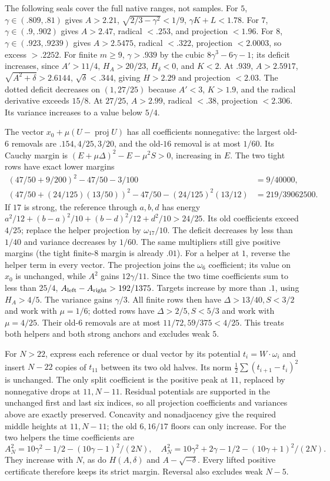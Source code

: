 The following seals cover the full native ranges, not samples.
For $5$, $\gamma\in(.809,.81)$ gives $A>2.21$,
$\sqrt{2/3-\gamma^2}<1/9$, $\gamma K+L<1.78$.
For $7$, $\gamma\in(.9,.902)$ gives $A>2.47$, radical $<.253$,
and projection $<1.96$.
For $8$, $\gamma\in(.923,.9239)$ gives $A>2.5475$, radical
$<.322$, projection $<2.0003$, so excess $>.2252$.
For finite $m\ge9$, $\gamma>.939$ by the cubic
$8\gamma^3-6\gamma-1$; its deficit increases, since
$A'>11/4$, $H_A>20/23$, $H_\delta<0$, and $K<2$.
At $.939$, $A>2.5917$, $\sqrt{A^2+\delta}>2.6144$,
$\sqrt\delta<.344$, giving $H>2.29$ and projection $<2.03$.
The dotted deficit decreases on $(1,27/25)$ because
$A'<3$, $K>1.9$, and the radical derivative exceeds $15/8$.
At $27/25$, $A>2.99$, radical $<.38$, projection $<2.306$.
Its variance increases to a value below $5/4$.

The vector $x_0+\mu(U-\operatorname{proj}U)$ has all coefficients
nonnegative: the largest old-$6$ removals are $.154,4/25,3/20$,
and the old-$16$ removal is at most $1/60$.
Its Cauchy margin is
$(E+\mu\Delta)^2-E-\mu^2S>0$, increasing in $E$.
The two tight rows have exact lower margins
\[
\begin{aligned}
 (47/50+9/200)^2-47/50-3/100&=9/40000,\\
 (47/50+(24/125)(13/50))^2-47/50-(24/125)^2(13/12)
 &=219/39062500.
\end{aligned}
\]
If $17$ is strong, the reference through $a,b,d$ has energy
$a^2/12+(b-a)^2/10+(b-d)^2/12+d^2/10>24/25$.
Its old coefficients exceed $4/25$; replace the helper projection
by $\omega_{17}/10$. The deficit decreases by less than $1/40$
and variance decreases by $1/60$. The same multipliers still give
positive margins (the tight finite-$8$ margin is already $.01$).
For a helper at $1$, reverse the helper term in every vector.
The projection joins the $\omega_6$ coefficient; its value on $x_0$
is unchanged, while $A^2$ gains $12\gamma/11$.
Since the two time coefficients sum to less than $25/4$,
$A_{\rm left}-A_{\rm right}>192/1375$.
Targets increase by more than $.1$, using $H_A>4/5$.
The variance gains $\gamma/3$. All finite rows then have
$\Delta>13/40,S<3/2$ and work with $\mu=1/6$;
dotted rows have $\Delta>2/5,S<5/3$ and work with $\mu=4/25$.
Their old-$6$ removals are at most $11/72,59/375<4/25$.
This treats both helpers and both strong anchors and excludes weak $5$.

For $N>22$, express each reference or dual vector by its potential
$t_i=W\cdot\omega_i$ and insert $N-22$ copies of $t_{11}$
between its two old halves. Its norm
$\frac12\sum(t_{i+1}-t_i)^2$ is unchanged.
The only split coefficient is the positive peak at $11$, replaced
by nonnegative drops at $11,N-11$. Residual potentials are supported
in the unchanged first and last six indices, so all projection
coefficients and variances above are exactly preserved.
Concavity and nonadjacency give the required middle heights at
$11,N-11$; the old $6,16/17$ floors can only increase.
For the two helpers the time coefficients are
\[
 A_N^2=10\gamma^2-1/2-(10\gamma-1)^2/(2N),\quad
 A_N^2=10\gamma^2+2\gamma-1/2-(10\gamma+1)^2/(2N).
\]
They increase with $N$, as do $H(A,\delta)$ and $A-\sqrt{-\delta}$.
Every lifted positive certificate therefore keeps its strict margin.
Reversal also excludes weak $N-5$.

